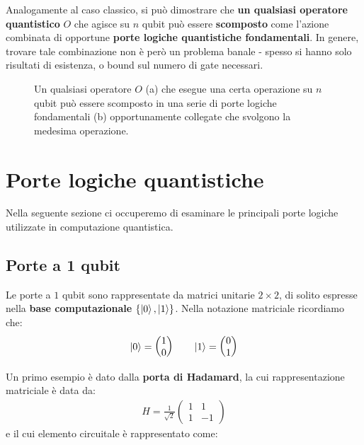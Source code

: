 \documentclass[../../InformazioneQuantistica.tex]{subfiles}
\begin{document}
Analogamente al caso classico, si può dimostrare che \textbf{un qualsiasi operatore quantistico} $O$ che agisce su $n$ qubit può essere\textbf{ scomposto} come l'azione combinata di opportune \textbf{porte logiche quantistiche fondamentali}. In genere, trovare tale combinazione non è però un problema banale - spesso si hanno solo risultati di esistenza, o bound sul numero di gate necessari.

\begin{figure}[H]
\centering

\caption{Un qualsiasi operatore $O$ (a) che esegue una certa operazione su $n$ qubit può essere scomposto in  una serie di porte logiche fondamentali (b) opportunamente collegate che svolgono la medesima operazione.\label{fig:scomposizione-porte-logiche}}
\end{figure}

\section{Porte logiche quantistiche}
Nella seguente sezione ci occuperemo di esaminare le principali porte logiche utilizzate in computazione quantistica.

\subsection{Porte a 1 qubit}
Le porte a $1$ qubit sono rappresentate da matrici unitarie $2\times 2$, di solito espresse nella \textbf{base computazionale} $\{\Ket{0}, \Ket{1}\}$. Nella notazione matriciale ricordiamo che:
\begin{align*}
\Ket{0} = \begin{pmatrix} 1 \\ 0 \end{pmatrix} \qquad \Ket{1} = \begin{pmatrix} 0 \\ 1 \end{pmatrix}
\end{align*}

Un primo esempio è dato dalla \textbf{porta di Hadamard}, la cui rappresentazione matriciale è data da:
\begin{align*}
H = \frac{1}{\sqrt{2}} \begin{pmatrix}
1 & 1\\1 & -1
\end{pmatrix}
\end{align*}
e il cui elemento circuitale è rappresentato come:
\end{document}
